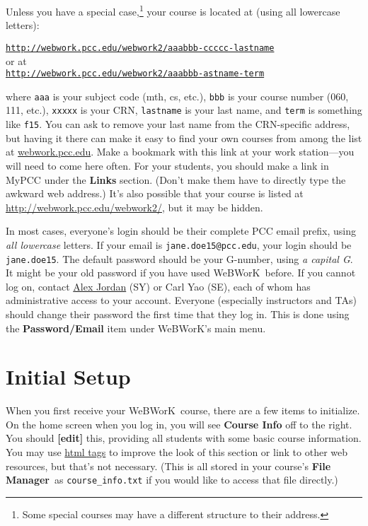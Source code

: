 \documentclass[12pt]{article}
\newcommand{\menu}[1]{\textbf{#1}}
\newcommand{\WW}{WeBWorK}
\newcommand{\FM}{\menu{File Manager}}
\begin{document}
Unless you have a special case,\footnote{Some special courses may have a different structure to their address.
} your course is located at (using all lowercase letters):
\begin{center}
	\href{http://webwork.pcc.edu/webwork2/}{\texttt{http://webwork.pcc.edu/webwork2/aaabbb-ccccc-lastname}}\\
	or at\\
	\href{http://webwork.pcc.edu/webwork2/}{\texttt{http://webwork.pcc.edu/webwork2/aaabbb-astname-term}}
\end{center} where \texttt{aaa} is your subject code (mth, cs, etc.), \texttt{bbb} is your course number (060, 111, etc.),  \texttt{xxxxx} is your CRN, \texttt{lastname} is your last name, and \texttt{term} is something like \texttt{f15}.
You can ask to remove your last name from the CRN-specific address, but having it there can make it easy to find your own courses from among the list at \url{webwork.pcc.edu}.
Make a bookmark with this link at your work station---you will need to come here often.
For your students, you should make a link in MyPCC under the \menu{Links} section.
(Don't make them have to directly type the awkward web address.) It's also possible that your course is listed at \href{http://webwork.pcc.edu/webwork2/}{http://webwork.pcc.edu/webwork2/}, but it may be hidden.

In most cases, everyone's login should be their complete PCC email prefix, using \emph{all lowercase} letters.
If your email is \texttt{jane.doe15@pcc.edu}, your login should be \texttt{jane.doe15}.
The default password should be your G-number, using \emph{a capital G}.
It might be your old password if you have used \WW\ before.
If you cannot log on, contact \href{mailto:alex.jordan@pcc.edu}{Alex Jordan} (SY) or Carl Yao (SE), each of whom has administrative access to your account.
Everyone (especially instructors and TAs) should change their password the first time that they log in.
This is done using the \menu{Password/Email} item under \WW's main menu.

\section{Initial Setup}
When you first receive your \WW\ course, there are a few items to initialize.
On the home screen when you log in, you will see \menu{Course Info} off to the right.
You should \menu{[edit]} this, providing all students with some basic course information.
You may use \href{http://en.wikipedia.org/wiki/HTML_element}{html tags} to improve the look of this section or link to other web resources, but that's not necessary.
(This is all stored in your course's \FM\  as \verb=course_info.txt= if you would like to access that file directly.)
\end{document}
